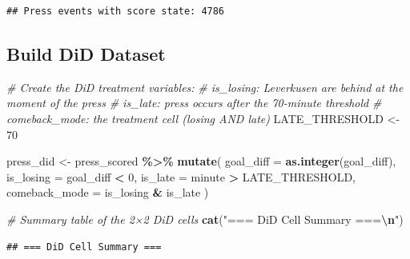 \documentclass[
]{article}
\newenvironment{Shaded}{\begin{snugshade}}{\end{snugshade}}
\newcommand{\AttributeTok}[1]{\textcolor[rgb]{0.13,0.29,0.53}{#1}}
\newcommand{\CommentTok}[1]{\textcolor[rgb]{0.56,0.35,0.01}{\textit{#1}}}
\newcommand{\DecValTok}[1]{\textcolor[rgb]{0.00,0.00,0.81}{#1}}
\newcommand{\FunctionTok}[1]{\textcolor[rgb]{0.13,0.29,0.53}{\textbf{#1}}}
\newcommand{\NormalTok}[1]{#1}
\newcommand{\OtherTok}[1]{\textcolor[rgb]{0.56,0.35,0.01}{#1}}
\newcommand{\SpecialCharTok}[1]{\textcolor[rgb]{0.81,0.36,0.00}{\textbf{#1}}}
\newcommand{\StringTok}[1]{\textcolor[rgb]{0.31,0.60,0.02}{#1}}
\begin{document}
\begin{verbatim}
## Press events with score state: 4786
\end{verbatim}

\subsection{Build DiD Dataset}\label{build-did-dataset}

\begin{Shaded}
\begin{Highlighting}[]
\CommentTok{\# Create the DiD treatment variables:}
\CommentTok{\#   is\_losing:    Leverkusen are behind at the moment of the press}
\CommentTok{\#   is\_late:      press occurs after the 70{-}minute threshold}
\CommentTok{\#   comeback\_mode: the treatment cell (losing AND late)}
\NormalTok{LATE\_THRESHOLD }\OtherTok{\textless{}{-}} \DecValTok{70}

\NormalTok{press\_did }\OtherTok{\textless{}{-}}\NormalTok{ press\_scored }\SpecialCharTok{\%\textgreater{}\%}
  \FunctionTok{mutate}\NormalTok{(}
    \AttributeTok{goal\_diff     =} \FunctionTok{as.integer}\NormalTok{(goal\_diff),}
    \AttributeTok{is\_losing     =}\NormalTok{ goal\_diff }\SpecialCharTok{\textless{}} \DecValTok{0}\NormalTok{,}
    \AttributeTok{is\_late       =}\NormalTok{ minute }\SpecialCharTok{\textgreater{}}\NormalTok{ LATE\_THRESHOLD,}
    \AttributeTok{comeback\_mode =}\NormalTok{ is\_losing }\SpecialCharTok{\&}\NormalTok{ is\_late}
\NormalTok{  )}

\CommentTok{\# Summary table of the 2×2 DiD cells}
\FunctionTok{cat}\NormalTok{(}\StringTok{"=== DiD Cell Summary ===}\SpecialCharTok{\textbackslash{}n}\StringTok{"}\NormalTok{)}
\end{Highlighting}
\end{Shaded}

\begin{verbatim}
## === DiD Cell Summary ===
\end{verbatim}
\end{document}
